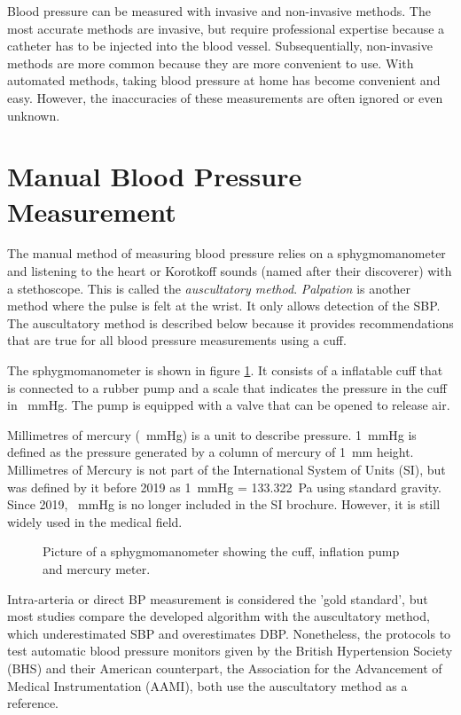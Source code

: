 Blood pressure can be measured with invasive and non-invasive methods. The most accurate methods are invasive, but require professional expertise because a catheter has to be injected into the blood vessel. Subsequentially, non-invasive methods are more common because they are more convenient to use. With automated methods, taking blood pressure at home has become convenient and easy. However, the inaccuracies of these measurements are often ignored or even unknown.

\section{Manual Blood Pressure Measurement}
The manual method of measuring blood pressure relies on a sphygmomanometer and listening to the heart or Korotkoff sounds (named after their discoverer) with a stethoscope. This is called the \emph{auscultatory method}. \emph{Palpation} is another method where the pulse is felt at the wrist. It only allows detection of the SBP. The auscultatory method is described below because it provides recommendations that are true for all blood pressure measurements using a cuff.

The sphygmomanometer is shown in figure \ref{fig:sphy}. It consists of a inflatable cuff that is connected to a rubber pump and a scale that indicates the pressure in the cuff in \SI{}{\mmHg}. The pump is equipped with a valve that can be opened to release air.


Millimetres of mercury (\SI{}{\mmHg}) is a unit to describe pressure. \SI{1}{\mmHg} is defined as the pressure generated by a column of mercury of \SI{1}{\mm} height. Millimetres of Mercury is not part of the International System of Units (SI), but was defined by it before 2019 as \SI{1}{\mmHg} = \SI{133.322}{\Pa} using standard gravity.\cite{SI2008} Since 2019, \SI{}{\mmHg} is no longer included in the SI brochure. However, it is still widely used in the medical field.


\begin{figure}[h]
\centering
\caption{Picture of a sphygmomanometer showing the cuff, inflation pump and mercury meter.}
\label{fig:sphy}
\end{figure}

Intra-arteria or direct BP measurement is considered the 'gold standard', but most studies compare the developed algorithm with the auscultatory method, which underestimated SBP and overestimates DBP. \cite{Sapinski1996} Nonetheless, the protocols to test automatic blood pressure monitors given by the British Hypertension Society (BHS) and their American counterpart, the Association for the Advancement of Medical Instrumentation (AAMI), both use the auscultatory method as a reference. \cite{Jazbinsek2010,BHS,AAMI}


